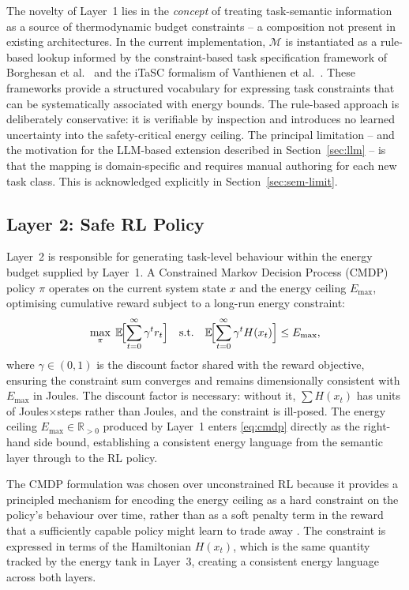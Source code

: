 \documentclass[11pt]{article}
\begin{document}
The novelty of Layer~1 lies in the \emph{concept} of treating task-semantic information as a
source of thermodynamic budget constraints -- a composition not present in existing
architectures. In the current implementation, $\mathcal{M}$ is instantiated as a rule-based
lookup informed by the constraint-based task specification framework of Borghesan et al.\
\cite{borghesan2016} and the iTaSC formalism of Vanthienen et al.\ \cite{vanthienen2013}.
These frameworks provide a structured vocabulary for expressing task constraints that can be
systematically associated with energy bounds. The rule-based approach is deliberately
conservative: it is verifiable by inspection and introduces no learned uncertainty into the
safety-critical energy ceiling. The principal limitation -- and the motivation for the LLM-based
extension described in Section~\ref{sec:llm} -- is that the mapping is domain-specific and
requires manual authoring for each new task class. This is acknowledged explicitly in
Section~\ref{sec:sem-limit}.

\subsection{Layer 2: Safe RL Policy}
\label{sec:layer2}

Layer~2 is responsible for generating task-level behaviour within the energy budget supplied
by Layer~1. A Constrained Markov Decision Process (CMDP) policy $\pi$ \cite{altman1999}
operates on the current system state $x$ and the energy ceiling $E_{\max}$, optimising
cumulative reward subject to a long-run energy constraint:
\begin{equation}
\max_\pi\;\mathbb{E}\!\Bigl[\sum_{t=0}^\infty \gamma^t r_t\Bigr]
\quad\text{s.t.}\quad
\mathbb{E}\!\Bigl[\sum_{t=0}^\infty \gamma^t H(x_t)\Bigr]\le E_{\max},
\label{eq:cmdp}
\end{equation}
where $\gamma\in(0,1)$ is the discount factor shared with the reward objective, ensuring the
constraint sum converges and remains dimensionally consistent with $E_{\max}$ in Joules.
The discount factor is necessary: without it, $\sum H(x_t)$ has units of Joules$\times$steps
rather than Joules, and the constraint is ill-posed. The energy ceiling $E_{\max}\in\mathbb{R}_{>0}$
produced by Layer~1 enters \eqref{eq:cmdp} directly as the right-hand side bound,
establishing a consistent energy language from the semantic layer through to the RL policy.

The CMDP formulation was chosen over unconstrained RL because it provides a principled
mechanism for encoding the energy ceiling as a hard constraint on the policy's behaviour over
time, rather than as a soft penalty term in the reward that a sufficiently capable policy might
learn to trade away \cite{garcia2015,achiam2017}. The constraint is expressed in terms of the
Hamiltonian $H(x_t)$, which is the same quantity tracked by the energy tank in Layer~3,
creating a consistent energy language across both layers.
\end{document}
